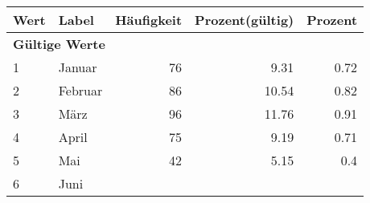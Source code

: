      \begin{longtable}{lXrrr}
     \toprule
     \textbf{Wert} & \textbf{Label} & \textbf{Häufigkeit} & \textbf{Prozent(gültig)} & \textbf{Prozent} \\
     \endhead
     \midrule
     \multicolumn{5}{l}{\textbf{Gültige Werte}}\\

     1 &
     \multicolumn{1}{X}{ Januar   } &


       \num{76} &
       \num[round-mode=places,round-precision=2]{9,31} &
         \num[round-mode=places,round-precision=2]{0,72} \\

     2 &
     \multicolumn{1}{X}{ Februar   } &


       \num{86} &
       \num[round-mode=places,round-precision=2]{10,54} &
         \num[round-mode=places,round-precision=2]{0,82} \\

     3 &
     \multicolumn{1}{X}{ März   } &


       \num{96} &
       \num[round-mode=places,round-precision=2]{11,76} &
         \num[round-mode=places,round-precision=2]{0,91} \\

     4 &
     \multicolumn{1}{X}{ April   } &


       \num{75} &
       \num[round-mode=places,round-precision=2]{9,19} &
         \num[round-mode=places,round-precision=2]{0,71} \\

     5 &
     \multicolumn{1}{X}{ Mai   } &


       \num{42} &
       \num[round-mode=places,round-precision=2]{5,15} &
         \num[round-mode=places,round-precision=2]{0,4} \\

     6 &
     \multicolumn{1}{X}{ Juni   } &



\end{longtable}
